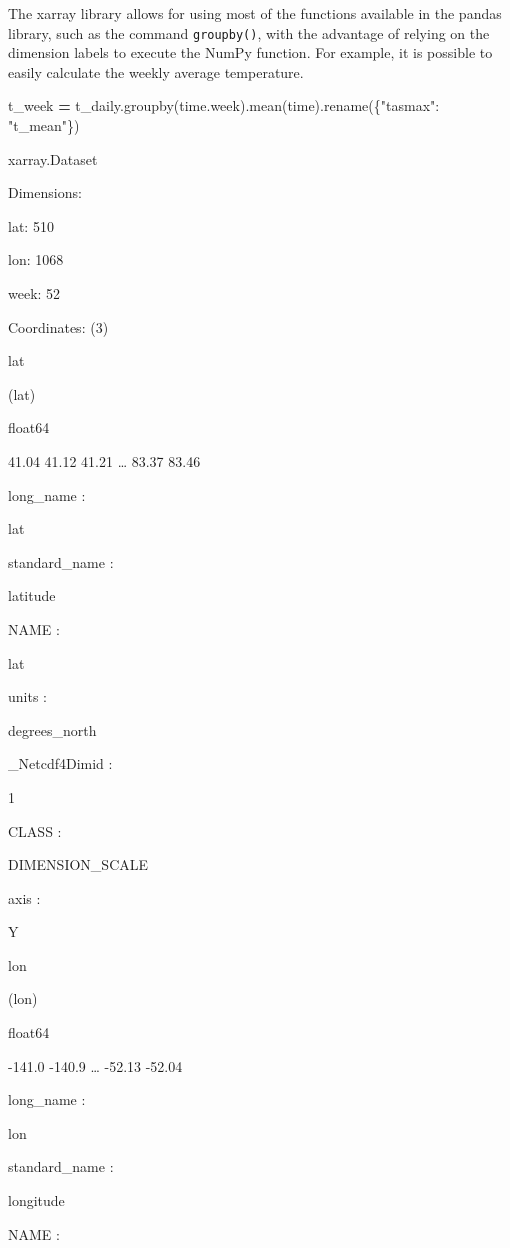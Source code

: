 \documentclass[
]{book}
\newenvironment{Shaded}{\begin{snugshade}}{\end{snugshade}}
\newcommand{\NormalTok}[1]{#1}
\newcommand{\OperatorTok}[1]{\textcolor[rgb]{0.81,0.36,0.00}{\textbf{#1}}}
\newcommand{\StringTok}[1]{\textcolor[rgb]{0.31,0.60,0.02}{#1}}
\begin{document}
The xarray library allows for using most of the functions available in the pandas library, such as the command \texttt{groupby()}, with the advantage of relying on the dimension labels to execute the NumPy function. For example, it is possible to easily calculate the weekly average temperature.

\begin{Shaded}
\begin{Highlighting}[]
\NormalTok{t\_week }\OperatorTok{=}\NormalTok{ t\_daily.groupby(}\StringTok{\textquotesingle{}time.week\textquotesingle{}}\NormalTok{).mean(}\StringTok{\textquotesingle{}time\textquotesingle{}}\NormalTok{).rename(\{}\StringTok{"tasmax"}\NormalTok{: }\StringTok{"t\_mean"}\NormalTok{\})}
\end{Highlighting}
\end{Shaded}

xarray.Dataset

Dimensions:

{lat}: 510

{lon}: 1068

{week}: 52

Coordinates: {(3)}

{lat}

(lat)

float64

41.04 41.12 41.21 \ldots{} 83.37 83.46

{long\_name :}

lat

{standard\_name :}

latitude

{NAME :}

lat

{units :}

degrees\_north

\_Netcdf4Dimid :

1

{CLASS :}

DIMENSION\_SCALE

{axis :}

Y

{lon}

(lon)

float64

-141.0 -140.9 \ldots{} -52.13 -52.04

{long\_name :}

lon

{standard\_name :}

longitude

{NAME :}
\end{document}
